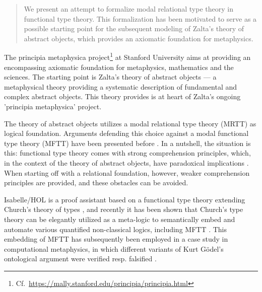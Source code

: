 %
\begin{isabellebody}%
%
%
\isadelimtheory
%
\endisadelimtheory
%
\isatagtheory
%
\endisatagtheory
{\isafoldtheory}%
%
\isadelimtheory
%
\endisadelimtheory
%
\begin{isamarkuptext}%
\begin{abstract}
We present an attempt to formalize modal relational type theory in functional type theory. This
formalization has been motivated to serve as a possible starting point for the subsequent modeling
of Zalta's theory of abstract objects, which  provides an axiomatic foundation for metaphysics.
\end{abstract}%
\end{isamarkuptext}\isamarkuptrue%
%
\isamarkuptrue%
%
\begin{isamarkuptext}%
The principia metaphysica project\footnote{Cf.~\url{https://mally.stanford.edu/principia/principia.html}} 
  \cite{zalta:_princ_metap} at Stanford University aims
  at providing an encompassing axiomatic foundation for metaphysics, mathematics and the sciences. 
  The starting point is Zalta's theory of abstract objects \cite{zalta83:_abstr_objec}  --- a metaphysical 
  theory providing a systematic description of fundamental and complex abstract objects. This 
  theory provides is at heart of Zalta's ongoing 'principia metaphysica' 
  project.
  
  The theory of abstract objects utilizes a modal relational type theory (MRTT) as 
  logical foundation.  Arguments
  defending this choice against a modal functional type theory (MFTT)
  have been presented before \cite{zalta11:_relat_versus_funct_found_logic}.
  In a nutshell, the situation is this: functional type theory comes with strong 
  comprehension principles, which, in the context of the theory of abstract objects, 
  have paradoxical implications \cite[chap.4]{zalta11:_relat_versus_funct_found_logic}. 
  When starting off with a relational foundation, however, 
  weaker comprehension principles are provided, and these obstacles can be avoided.

  Isabelle/HOL is a proof assistant based on a functional type theory extending
  Church's theory of types \cite{Church40}, and recently it has been shown 
  that Church's type theory can be elegantly utilized as a meta-logic to semantically embed and 
  automate various quantified non-classical logics, including MFTT \cite{J23,C40}. 
  This embedding of MFTT has subsequently been employed in a case study in
  computational metaphysics, in which different variants of Kurt G{\"o}del's ontological 
  argument were verified resp. falsified \cite{C40,C55}. 


\end{isamarkuptext}
\end{isabellebody}
